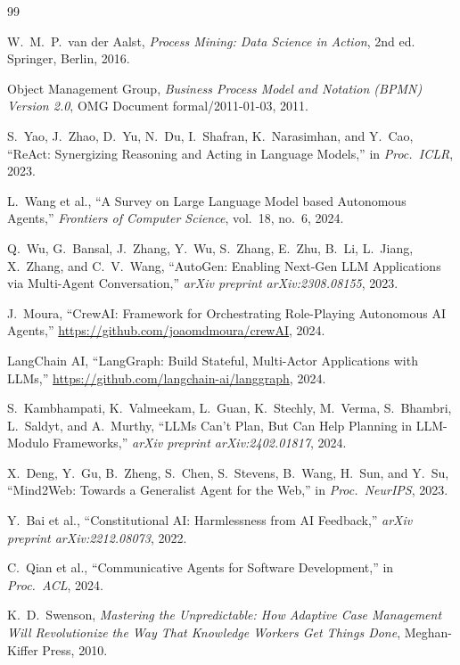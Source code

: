 \documentclass[11pt,a4paper]{article}
\begin{document}

\begin{thebibliography}{99}

W.\ M.\ P.\ van der Aalst,
\emph{Process Mining: Data Science in Action}, 2nd ed.
Springer, Berlin, 2016.

Object Management Group,
\emph{Business Process Model and Notation (BPMN) Version 2.0},
OMG Document formal/2011-01-03, 2011.

S.\ Yao, J.\ Zhao, D.\ Yu, N.\ Du, I.\ Shafran, K.\ Narasimhan, and Y.\ Cao,
``ReAct: Synergizing Reasoning and Acting in Language Models,''
in \emph{Proc.\ ICLR}, 2023.

L.\ Wang et al.,
``A Survey on Large Language Model based Autonomous Agents,''
\emph{Frontiers of Computer Science}, vol.\ 18, no.\ 6, 2024.

Q.\ Wu, G.\ Bansal, J.\ Zhang, Y.\ Wu, S.\ Zhang, E.\ Zhu, B.\ Li,
L.\ Jiang, X.\ Zhang, and C.\ V.\ Wang,
``AutoGen: Enabling Next-Gen LLM Applications via Multi-Agent Conversation,''
\emph{arXiv preprint arXiv:2308.08155}, 2023.

J.\ Moura,
``CrewAI: Framework for Orchestrating Role-Playing Autonomous AI Agents,''
\url{https://github.com/joaomdmoura/crewAI}, 2024.

LangChain AI,
``LangGraph: Build Stateful, Multi-Actor Applications with LLMs,''
\url{https://github.com/langchain-ai/langgraph}, 2024.

S.\ Kambhampati, K.\ Valmeekam, L.\ Guan, K.\ Stechly, M.\ Verma,
S.\ Bhambri, L.\ Saldyt, and A.\ Murthy,
``LLMs Can't Plan, But Can Help Planning in LLM-Modulo Frameworks,''
\emph{arXiv preprint arXiv:2402.01817}, 2024.

X.\ Deng, Y.\ Gu, B.\ Zheng, S.\ Chen, S.\ Stevens, B.\ Wang, H.\ Sun,
and Y.\ Su,
``Mind2Web: Towards a Generalist Agent for the Web,''
in \emph{Proc.\ NeurIPS}, 2023.

Y.\ Bai et al.,
``Constitutional AI: Harmlessness from AI Feedback,''
\emph{arXiv preprint arXiv:2212.08073}, 2022.

C.\ Qian et al.,
``Communicative Agents for Software Development,''
in \emph{Proc.\ ACL}, 2024.

K.\ D.\ Swenson,
\emph{Mastering the Unpredictable: How Adaptive Case Management Will
Revolutionize the Way That Knowledge Workers Get Things Done},
Meghan-Kiffer Press, 2010.


\end{thebibliography}
\end{document}
